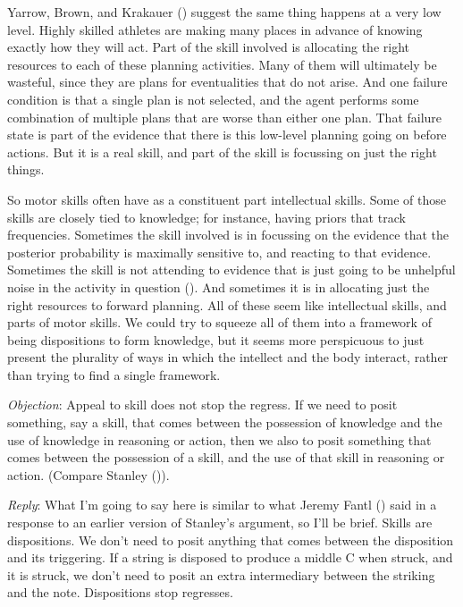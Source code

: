 \documentclass[
  11pt,
  letterpaper,
  DIV=11,
  numbers=noendperiod,
  twoside]{scrartcl}
\begin{document}
Yarrow, Brown, and Krakauer ()
suggest the same thing happens at a very low level. Highly skilled
athletes are making many places in advance of knowing exactly how they
will act. Part of the skill involved is allocating the right resources
to each of these planning activities. Many of them will ultimately be
wasteful, since they are plans for eventualities that do not arise. And
one failure condition is that a single plan is not selected, and the
agent performs some combination of multiple plans that are worse than
either one plan. That failure state is part of the evidence that there
is this low-level planning going on before actions. But it is a real
skill, and part of the skill is focussing on just the right things.

So motor skills often have as a constituent part intellectual skills.
Some of those skills are closely tied to knowledge; for instance, having
priors that track frequencies. Sometimes the skill involved is in
focussing on the evidence that the posterior probability is maximally
sensitive to, and reacting to that evidence. Sometimes the skill is not
attending to evidence that is just going to be unhelpful noise in the
activity in question (). And sometimes it is in allocating just the right
resources to forward planning. All of these seem like intellectual
skills, and parts of motor skills. We could try to squeeze all of them
into a framework of being dispositions to form knowledge, but it seems
more perspicuous to just present the plurality of ways in which the
intellect and the body interact, rather than trying to find a single
framework.

\emph{Objection}: Appeal to skill does not stop the regress. If we need
to posit something, say a skill, that comes between the possession of
knowledge and the use of knowledge in reasoning or action, then we also
to posit something that comes between the possession of a skill, and the
use of that skill in reasoning or action. (Compare Stanley
()).

\emph{Reply}: What I'm going to say here is similar to what Jeremy Fantl
() said in a response to an earlier
version of Stanley's argument, so I'll be brief. Skills are
dispositions. We don't need to posit anything that comes between the
disposition and its triggering. If a string is disposed to produce a
middle C when struck, and it is struck, we don't need to posit an extra
intermediary between the striking and the note. Dispositions stop
regresses.
\end{document}

